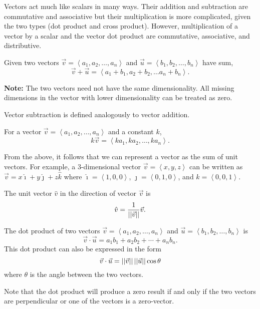 \documentclass[12pt]{scrartcl}
\newcommand*{\magnitude}[1]{\abs{\abs{#1}}}
\begin{document}
\begin{remark}
    Vectors act much like scalars in many ways. Their addition and subtraction are commutative and associative but their multiplication is more complicated, given the two types (dot product and cross product). However, multiplication of a vector by a scalar and the vector dot product are commutative, associative, and distributive.
\end{remark}

\begin{definition}
    Given two vectors $\vec{v} = \left<a_{1}, a_{2}, \dots, a_{n}\right>$ and $\vec{u} = \left<b_{1}, b_{2}, \dots, b_{n}\right>$ have sum,
    \[\vec{v} + \vec{u} = \left<a_{1} + b_{1}, a_{2} + b_{2}, \dots a_{n} + b_{n}\right>.\]

    \textbf{Note:} The two vectors need not have the same dimensionality. All missing dimensions in the vector with lower dimensionality can be treated as zero.
\end{definition}

\begin{definition}
    Vector subtraction is defined analogously to vector addition.
\end{definition}

\begin{definition}
    For a vector $\vec{v} = \left<a_{1}, a_{2}, \dots, a_{n}\right>$ and a constant $k$,
    \[k\vec{v} = \left<ka_{1}, ka_{2}, \dots, ka_{n}\right>.\]
\end{definition}

\begin{corollary}
    From the above, it follows that we can represent a vector as the sum of unit vectors. For example, a 3-dimensional vector $\vec{v} = \left<x, y, z\right>$ can be written as $\vec{v} = x\hat{\imath} + y\hat{\jmath} + z\hat{k}$ where $\hat{\imath} = \left<1, 0, 0\right>$, $\hat{\jmath} = \left<0, 1, 0\right>$, and $\hat{k} = \left<0, 0, 1\right>$.
\end{corollary}

\begin{definition}
    The unit vector $\hat{v}$ in the direction of vector $\vec{v}$ is
    \[\hat{v} = \frac{1}{\magnitude{\vec{v}}}\vec{v}.\]
\end{definition}

\begin{definition}
    The dot product of two vectors $\vec{v} = \left<a_{1}, a_{2}, \dots, a_{n}\right>$ and $\vec{u} = \left<b_{1}, b_{2}, \dots, b_{n}\right>$ is
    \[\vec{v} \cdot \vec{u} = a_{1}b_{1} + a_{2}b_{2} + \cdots + a_{n}b_{n}.\]
    This dot product can also be expressed in the form
    \[\vec{v} \cdot \vec{u} = \magnitude{\vec{v}}\magnitude{\vec{u}}\cos\theta\]
    where $\theta$ is the angle between the two vectors.
\end{definition}

\begin{remark}
    Note that the dot product will produce a zero result if and only if the two vectors are perpendicular or one of the vectors is a zero-vector.
\end{remark}
\end{document}
